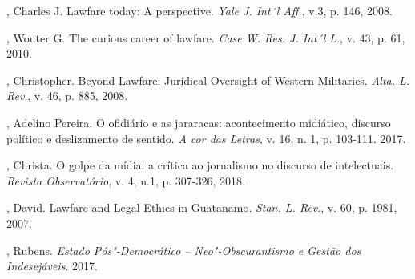 \begin{Parskip}
, Charles J. Lawfare today: A perspective. \emph{Yale J.
Int´l Aff.}, v.3, p. 146, 2008.

, Wouter G. The curious career of lawfare. \emph{Case W. Res. J.
Int´l L}., v. 43, p. 61, 2010.

, Christopher. Beyond Lawfare: Juridical Oversight of Western
Militaries. \emph{Alta. L. Rev}., v. 46, p. 885, 2008.

, Adelino Pereira. O ofidiário e as jararacas: acontecimento
midiático, discurso político e deslizamento de sentido. \emph{A cor
das Letras}, v. 16, n. 1, p. 103-111. 2017.

, Christa. O golpe da mídia: a crítica ao jornalismo no discurso
de intelectuais. \emph{Revista Observatório}, v. 4, n.1, p. 307-326,
2018.

, David. Lawfare and Legal Ethics in Guatanamo. \emph{Stan. L.
Rev}., v. 60, p. 1981, 2007.

, Rubens. \emph{Estado Pós"-Democrático -- Neo"-Obscurantismo e
Gestão dos Indesejáveis}. 2017.
\end{Parskip}